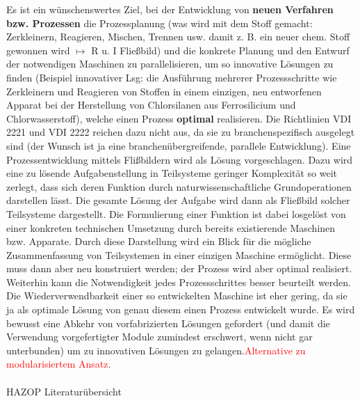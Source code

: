 Es ist ein w\"unschenswertes Ziel, bei der Entwicklung von \textbf{neuen Verfahren bzw. Prozessen} die Prozessplanung (was wird mit dem Stoff gemacht: Zerkleinern, Reagieren, Mischen, Trennen usw. damit z. B. ein neuer chem. Stoff gewonnen wird $\mapsto$ R u. I Flie\ss{}bild) und die konkrete Planung und den Entwurf der notwendigen Maschinen zu parallelisieren, um so innovative L\"osungen zu finden (Beispiel innovativer Lsg: die Ausf\"uhrung mehrerer Prozessschritte wie Zerkleinern und Reagieren von Stoffen in einem einzigen, neu entworfenen Apparat bei der Herstellung von Chlorsilanen aus Ferrosilicium und Chlorwasserstoff), welche einen Prozess \textbf{optimal} realisieren. Die Richtlinien VDI 2221 und VDI 2222 reichen dazu nicht aus, da sie zu branchenspezifisch ausgelegt sind (der Wunsch ist ja eine branchen\"ubergreifende, parallele Entwicklung). Eine Prozessentwicklung mittels Fli\ss{}bildern wird als L\"osung vorgeschlagen. Dazu wird eine zu l\"osende Aufgabenstellung in Teilsysteme geringer Komplexit\"at so weit zerlegt, dass sich deren Funktion durch naturwissenschaftliche Grundoperationen darstellen l\"asst. Die gesamte L\"osung der Aufgabe wird dann als Flie\ss{}bild solcher Teilsysteme dargestellt. Die Formulierung einer Funktion  ist dabei losgel\"ost von einer konkreten technischen Umsetzung durch bereits existierende Maschinen bzw. Apparate. Durch diese Darstellung wird ein Blick f\"ur die m\"ogliche Zusammenfassung von Teilsystemen in einer einzigen Maschine erm\"oglicht. Diese muss dann aber neu konstruiert werden; der Prozess wird aber optimal realisiert. Weiterhin kann die  Notwendigkeit jedes Prozessschrittes besser beurteilt werden. Die Wiederverwendbarkeit einer so entwickelten Maschine ist eher gering, da sie ja als optimale L\"osung von genau diesem einen Prozess entwickelt wurde. Es wird bewusst eine Abkehr von vorfabrizierten L\"osungen gefordert (und damit die Verwendung vorgefertigter Module zumindest erschwert, wenn nicht gar unterbunden) um zu innovativen L\"osungen zu gelangen.\textcolor{red}{Alternative zu modularisiertem Ansatz}.

\paragraph*{\cite{Dunjo2010}} HAZOP Literatur\"ubersicht

\paragraph*{\cite{Graf2000}}

